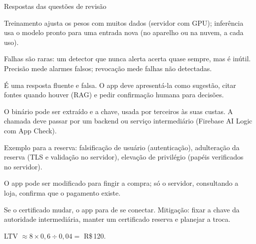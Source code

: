 \documentclass[aspectratio=169,10pt]{beamer}
\begin{document}
\begin{frame}{Respostas das questões de revisão}
  \begin{respostas}
    \item Treinamento ajusta os pesos com muitos dados (servidor com GPU); inferência usa o modelo pronto para uma entrada nova (no aparelho ou na nuvem, a cada uso).
    \item Falhas são raras: um detector que nunca alerta acerta quase sempre, mas é inútil. Precisão mede alarmes falsos; revocação mede falhas não detectadas.
    \item É uma resposta fluente e falsa. O app deve apresentá-la como sugestão, citar fontes quando houver (RAG) e pedir confirmação humana para decisões.
    \item O binário pode ser extraído e a chave, usada por terceiros às suas custas. A chamada deve passar por um backend ou serviço intermediário (Firebase AI Logic com App Check).
    \item Exemplo para a reserva: falsificação de usuário (autenticação), adulteração da reserva (TLS e validação no servidor), elevação de privilégio (papéis verificados no servidor).
    \item O app pode ser modificado para fingir a compra; só o servidor, consultando a loja, confirma que o pagamento existe.
    \item Se o certificado mudar, o app para de se conectar. Mitigação: fixar a chave da autoridade intermediária, manter um certificado reserva e planejar a troca.
    \item LTV $\approx 8 \times 0{,}6 \div 0{,}04 =$ R\$\,120.
  \end{respostas}
\end{frame}

\begin{frame}
\end{frame}
\end{document}
